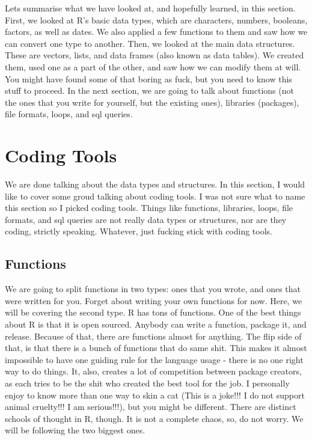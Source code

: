 \documentclass[]{book}
\begin{document}
Lets summarise what we have looked at, and hopefully learned, in this section. First, we looked at R's basic data types, which are characters, numbers, booleans, factors, as well as dates. We also applied a few functions to them and saw how we can convert one type to another. Then, we looked at the main data structures. These are vectors, lists, and data frames (also known as data tables). We created them, used one as a part of the other, and saw how we can modify them at will. You might have found some of that boring as fuck, but you need to know this stuff to proceed. In the next section, we are going to talk about functions (not the ones that you write for yourself, but the existing ones), libraries (packages), file formats, loops, and sql queries.

\hypertarget{coding-tools}{%
\section{Coding Tools}\label{coding-tools}}

We are done talking about the data types and structures. In this section, I would like to cover some groud talking about coding tools. I was not sure what to name this section so I picked coding tools. Things like functions, libraries, loops, file formats, and sql queries are not really data types or structures, nor are they coding, strictly speaking. Whatever, just fucking stick with coding tools.

\hypertarget{functions}{%
\subsection{Functions}\label{functions}}

We are going to split functions in two types: ones that you wrote, and ones that were written for you. Forget about writing your own functions for now. Here, we will be covering the second type. R has tons of functions. One of the best things about R is that it is open sourced. Anybody can write a function, package it, and release. Because of that, there are functions almost for anything. The flip side of that, is that there is a bunch of functions that do same shit. This makes it almost impossible to have one guiding rule for the language usage - there is no one right way to do things. It, also, creates a lot of competition between package creators, as each tries to be the shit who created the best tool for the job. I personally enjoy to know more than one way to skin a cat (This is a joke!!! I do not support animal cruelty!!! I am serious!!!), but you might be different. There are distinct schools of thought in R, though. It is not a complete chaos, so, do not worry. We will be following the two biggest ones.
\end{document}

